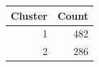 \begin{tabular}{rr}
\toprule
Cluster & Count \\
\midrule
1 & 482 \\
2 & 286 \\
\bottomrule
\end{tabular}
